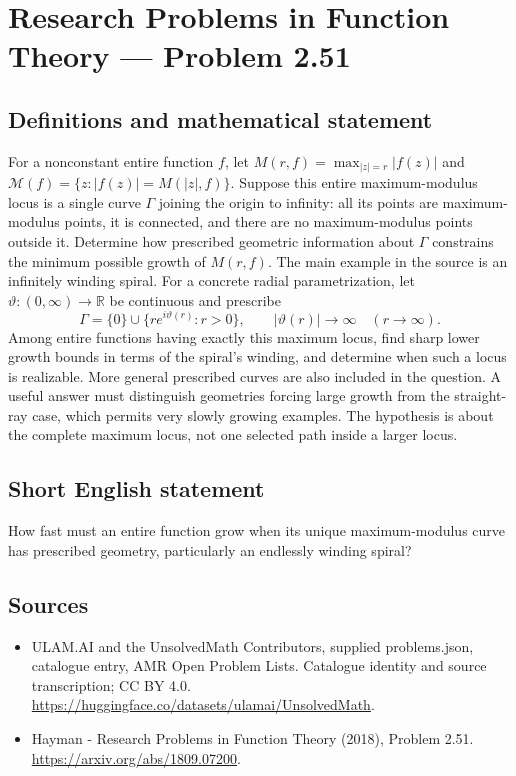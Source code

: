 \documentclass[11pt,a4paper]{article}
\begin{document}
\section*{Research Problems in Function Theory — Problem 2.51}\label{statement}

\subsection{Definitions and mathematical statement}
For a nonconstant entire function $f$, let
$M(r,f)=\max_{|z|=r}|f(z)|$ and
$\mathcal M(f)=\{z:|f(z)|=M(|z|,f)\}$.
Suppose this entire maximum-modulus locus is a single curve $\Gamma$ joining the origin to infinity: all its points are maximum-modulus points, it is connected, and there are no maximum-modulus points outside it.
Determine how prescribed geometric information about $\Gamma$ constrains the minimum possible growth of $M(r,f)$. The main example in the source is an infinitely winding spiral. For a concrete radial parametrization, let $\vartheta:(0,\infty)\to\mathbb R$ be continuous and prescribe
\[
\Gamma=\{0\}\cup\{re^{i\vartheta(r)}:r>0\},
\qquad |\vartheta(r)|\to\infty\quad(r\to\infty).
\]
Among entire functions having exactly this maximum locus, find sharp lower growth bounds in terms of the spiral's winding, and determine when such a locus is realizable. More general prescribed curves are also included in the question. A useful answer must distinguish geometries forcing large growth from the straight-ray case, which permits very slowly growing examples. The hypothesis is about the complete maximum locus, not one selected path inside a larger locus.
\subsection{Short English statement}
How fast must an entire function grow when its unique maximum-modulus curve has prescribed geometry, particularly an endlessly winding spiral?
\subsection{Sources}
\begin{itemize}
\item[S1] ULAM.AI and the UnsolvedMath Contributors, supplied problems.json, catalogue entry, AMR Open Problem Lists. Catalogue identity and source transcription; CC BY 4.0.
\url{https://huggingface.co/datasets/ulamai/UnsolvedMath}.
\item[S2] Hayman - Research Problems in Function Theory (2018), Problem 2.51. 
\url{https://arxiv.org/abs/1809.07200}.
\end{itemize}
\end{document}
